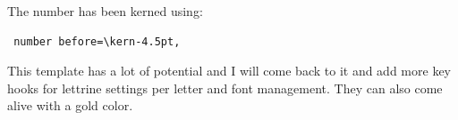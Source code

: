 The number has been kerned using:

\begin{lstlisting}
 number before=\kern-4.5pt,
\end{lstlisting}

This template has a lot of potential and I will come back to it and add more key hooks for lettrine settings per letter and font management. They can also come alive with a gold color.

